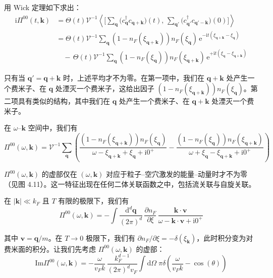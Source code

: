 用 Wick 定理如下求出：
\begin{align*}
\mathrm{i}\Pi^{00}(t,\pmb{k}) &= \Theta(t)\mathcal{V}^{-1}\left\langle \Big[\sum_{\pmb{q}}\big(c^{\dagger}_{\pmb{q}}c_{\pmb{q}+\pmb{k}}\big)(t),\, \sum_{\pmb{q}'}\big(c^{\dagger}_{\pmb{q}'}c_{\pmb{q}'-\pmb{k}}\big)(0)\Big] \right\rangle \tag{4.3.1}\\
&= \Theta(t)\mathcal{V}^{-1}\sum_{\pmb{q}}\left(1-n_F(\xi_{\pmb{q}+\pmb{k}})\right)n_F(\xi_{\pmb{q}})\,\mathrm{e}^{-\mathrm{i}t(\xi_{\pmb{q}+\pmb{k}}-\xi_{\pmb{q}})}\\
&\quad -\, \Theta(t)\mathcal{V}^{-1}\sum_{\pmb{q}}\left(1-n_F(\xi_{\pmb{q}})\right)n_F(\xi_{\pmb{q}+\pmb{k}})\,\mathrm{e}^{+\mathrm{i}t(\xi_{\pmb{q}}-\xi_{\pmb{q}+\pmb{k}})}
\end{align*}

只有当 $\pmb{q}'=\pmb{q}+\pmb{k}$ 时，上述平均才不为零。在第一项中，我们在 $\pmb{q}+\pmb{k}$ 处产生一个费米子、在 $\pmb{q}$ 处湮灭一个费米子，这给出因子 $\left(1-n_F(\xi_{\pmb{q}+\pmb{k}})\right)n_F(\xi_{\pmb{q}})$。第二项具有类似的结构，其中我们在 $\pmb{q}$ 处产生一个费米子、在 $\pmb{q}+\pmb{k}$ 处湮灭一个费米子。

在 $\omega$–$\pmb{k}$ 空间中，我们有
\begin{equation*}
\Pi^{00}(\omega,\pmb{k}) = \mathcal{V}^{-1}\sum_{\pmb{q}}\left( \frac{\left(1-n_F(\xi_{\pmb{q}+\pmb{k}})\right)n_F(\xi_{\pmb{q}})}{\omega-\xi_{\pmb{q}+\pmb{k}}+\xi_{\pmb{q}}+\mathrm{i}0^{+}} - \frac{\left(1-n_F(\xi_{\pmb{q}})\right)n_F(\xi_{\pmb{q}+\pmb{k}})}{\omega+\xi_{\pmb{q}}-\xi_{\pmb{q}+\pmb{k}}+\mathrm{i}0^{+}} \right)
\end{equation*}

$\Pi^{00}(\omega,\pmb{k})$ 的虚部仅在 $(\omega,\pmb{k})$ 对应于粒子–空穴激发的能量–动量时才不为零（见图 4.11）。这一特征出现在任何二体关联函数之中，包括流关联与自旋关联。

在 $|\pmb{k}|\ll k_F$ 且 $T$ 有限的极限下，我们有
\begin{equation*}
\Pi^{00}(\omega,\pmb{k}) = -\int \frac{\mathrm{d}^d\pmb{q}}{(2\pi)^d}\, \frac{\partial n_F}{\partial\xi}\, \frac{\pmb{k}\cdot\pmb{v}}{\omega-\pmb{k}\cdot\pmb{v}+\mathrm{i}0^{+}}
\end{equation*}

其中 $\pmb{v}=\pmb{q}/m$。在 $T\to 0$ 极限下，我们有 $\partial n_F/\partial\xi=-\delta(\xi_{\pmb{k}})$，此时积分变为对费米面的积分。让我们先考虑 $\Pi^{00}(\omega,\pmb{k})$ 的虚部：
\begin{equation*}
\mathrm{Im}\Pi^{00}(\omega,\pmb{k}) = -\frac{\omega}{v_F k}\, \frac{k_F^{d-1}}{(2\pi)^d v_F} \int \mathrm{d}\Omega\; \pi\delta\left(\frac{\omega}{v_F k}-\cos(\theta)\right)
\end{equation*}

